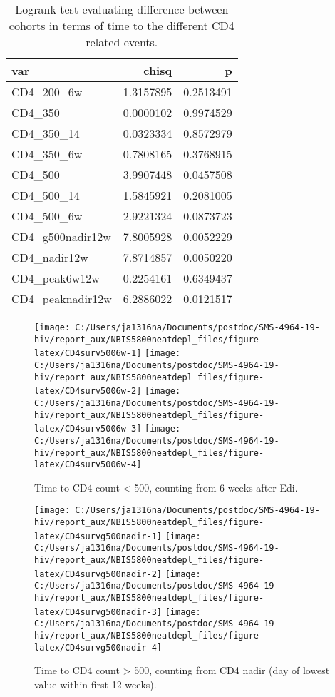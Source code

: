 \documentclass[
]{article}
\begin{document}
\begin{table}

\caption{\label{tab:CD4logrank}Logrank test evaluating difference between cohorts in terms of time to the different CD4 related events.}
\centering
\begin{tabular}[t]{l|r|r}
\hline
var & chisq & p\\
\hline
CD4\_200\_6w & 1.3157895 & 0.2513491\\
\hline
CD4\_350 & 0.0000102 & 0.9974529\\
\hline
CD4\_350\_14 & 0.0323334 & 0.8572979\\
\hline
CD4\_350\_6w & 0.7808165 & 0.3768915\\
\hline
CD4\_500 & 3.9907448 & 0.0457508\\
\hline
CD4\_500\_14 & 1.5845921 & 0.2081005\\
\hline
CD4\_500\_6w & 2.9221324 & 0.0873723\\
\hline
CD4\_g500nadir12w & 7.8005928 & 0.0052229\\
\hline
CD4\_nadir12w & 7.8714857 & 0.0050220\\
\hline
CD4\_peak6w12w & 0.2254161 & 0.6349437\\
\hline
CD4\_peaknadir12w & 6.2886022 & 0.0121517\\
\hline
\end{tabular}
\end{table}

\begin{figure}
\texttt{[image: C:/Users/ja1316na/Documents/postdoc/SMS-4964-19-hiv/report\_aux/NBIS5800neatdepl\_files/figure-latex/CD4surv5006w-1]} \texttt{[image: C:/Users/ja1316na/Documents/postdoc/SMS-4964-19-hiv/report\_aux/NBIS5800neatdepl\_files/figure-latex/CD4surv5006w-2]} \texttt{[image: C:/Users/ja1316na/Documents/postdoc/SMS-4964-19-hiv/report\_aux/NBIS5800neatdepl\_files/figure-latex/CD4surv5006w-3]} \texttt{[image: C:/Users/ja1316na/Documents/postdoc/SMS-4964-19-hiv/report\_aux/NBIS5800neatdepl\_files/figure-latex/CD4surv5006w-4]} \caption{Time to CD4 count < 500, counting from 6 weeks after Edi.}\label{fig:CD4surv5006w}
\end{figure}

\begin{figure}
\texttt{[image: C:/Users/ja1316na/Documents/postdoc/SMS-4964-19-hiv/report\_aux/NBIS5800neatdepl\_files/figure-latex/CD4survg500nadir-1]} \texttt{[image: C:/Users/ja1316na/Documents/postdoc/SMS-4964-19-hiv/report\_aux/NBIS5800neatdepl\_files/figure-latex/CD4survg500nadir-2]} \texttt{[image: C:/Users/ja1316na/Documents/postdoc/SMS-4964-19-hiv/report\_aux/NBIS5800neatdepl\_files/figure-latex/CD4survg500nadir-3]} \texttt{[image: C:/Users/ja1316na/Documents/postdoc/SMS-4964-19-hiv/report\_aux/NBIS5800neatdepl\_files/figure-latex/CD4survg500nadir-4]} \caption{Time to CD4 count > 500, counting from CD4 nadir (day of lowest value within first 12 weeks).}\label{fig:CD4survg500nadir}
\end{figure}
\end{document}
